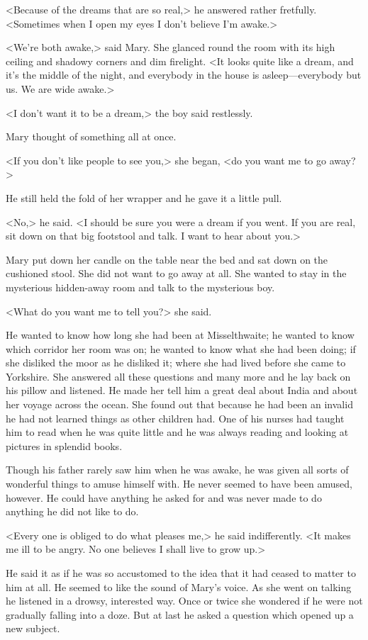 <Because of the dreams that are so real,> he answered rather fretfully. <Sometimes when I open my eyes I don't believe I'm awake.>

<We're both awake,> said Mary. She glanced round the room with its high ceiling and shadowy corners and dim firelight. <It looks quite like a dream, and it's the middle of the night, and everybody in the house is asleep—everybody but us. We are wide awake.>

<I don't want it to be a dream,> the boy said restlessly.

Mary thought of something all at once.

<If you don't like people to see you,> she began, <do you want me to go away?>

He still held the fold of her wrapper and he gave it a little pull.

<No,> he said. <I should be sure you were a dream if you went. If you are real, sit down on that big footstool and talk. I want to hear about you.>

Mary put down her candle on the table near the bed and sat down on the cushioned stool. She did not want to go away at all. She wanted to stay in the mysterious hidden-away room and talk to the mysterious boy.

<What do you want me to tell you?> she said.

He wanted to know how long she had been at Misselthwaite; he wanted to know which corridor her room was on; he wanted to know what she had been doing; if she disliked the moor as he disliked it; where she had lived before she came to Yorkshire. She answered all these questions and many more and he lay back on his pillow and listened. He made her tell him a great deal about India and about her voyage across the ocean. She found out that because he had been an invalid he had not learned things as other children had. One of his nurses had taught him to read when he was quite little and he was always reading and looking at pictures in splendid books.

Though his father rarely saw him when he was awake, he was given all sorts of wonderful things to amuse himself with. He never seemed to have been amused, however. He could have anything he asked for and was never made to do anything he did not like to do.

<Every one is obliged to do what pleases me,> he said indifferently. <It makes me ill to be angry. No one believes I shall live to grow up.>

He said it as if he was so accustomed to the idea that it had ceased to matter to him at all. He seemed to like the sound of Mary's voice. As she went on talking he listened in a drowsy, interested way. Once or twice she wondered if he were not gradually falling into a doze. But at last he asked a question which opened up a new subject.

